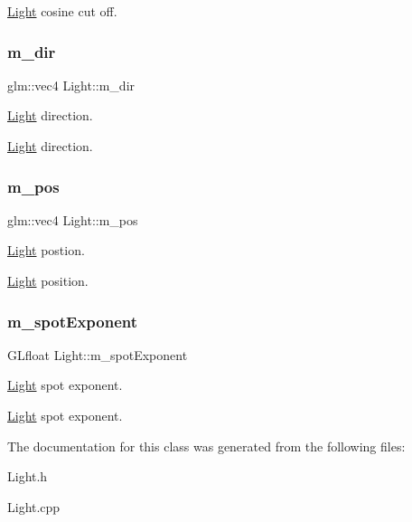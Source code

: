 \hyperlink{class_light}{Light} cosine cut off. \mbox{\label{class_light_a837f0e73f495fd9361b6eecaafaef275}} 
\subsubsection{\texorpdfstring{m\+\_\+dir}{m\_dir}}
{\footnotesize\ttfamily glm\+::vec4 Light\+::m\+\_\+dir\hspace{0.3cm}{\ttfamily [protected]}}



\hyperlink{class_light}{Light} direction. 

\hyperlink{class_light}{Light} direction. \mbox{\label{class_light_a108cbac703d7fc2bc6eb39185d9bead9}} 
\subsubsection{\texorpdfstring{m\+\_\+pos}{m\_pos}}
{\footnotesize\ttfamily glm\+::vec4 Light\+::m\+\_\+pos\hspace{0.3cm}{\ttfamily [protected]}}



\hyperlink{class_light}{Light} postion. 

\hyperlink{class_light}{Light} position. \mbox{\label{class_light_a262000d67538f1a25613e18fe17668cd}} 
\subsubsection{\texorpdfstring{m\+\_\+spot\+Exponent}{m\_spotExponent}}
{\footnotesize\ttfamily G\+Lfloat Light\+::m\+\_\+spot\+Exponent\hspace{0.3cm}{\ttfamily [protected]}}



\hyperlink{class_light}{Light} spot exponent. 

\hyperlink{class_light}{Light} spot exponent. 

The documentation for this class was generated from the following files\+:\begin{DoxyCompactItemize}
\item 
Light.\+h\item 
Light.\+cpp\end{DoxyCompactItemize}
